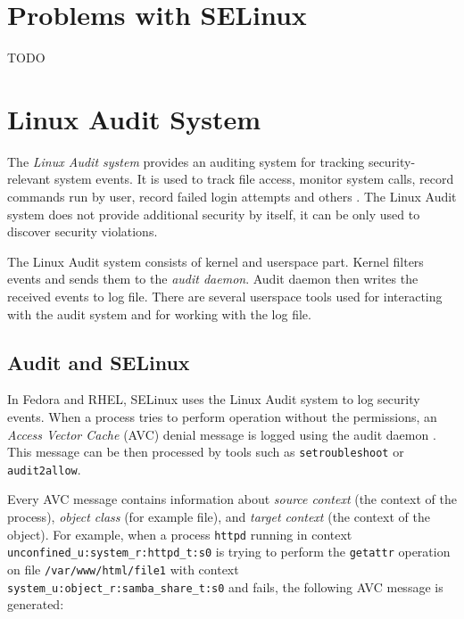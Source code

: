 \section{Problems with SELinux}
TODO

\section{Linux Audit System}
The \emph{Linux Audit system} provides an auditing system for tracking
security-relevant system events. It is used to track file access, monitor system
calls, record commands run by user, record failed login attempts and others
\cite{secguide}. The Linux Audit system does not provide additional security by
itself, it can be only used to discover security violations.

The Linux Audit system consists of kernel and userspace part. Kernel filters
events and sends them to the \emph{audit daemon}. Audit daemon then writes the
received events to log file. There are several userspace tools used for
interacting with the audit system and for working with the log file.

\subsection{Audit and SELinux}

In Fedora and RHEL, SELinux uses the Linux Audit system to log security events.
When a process tries to perform operation without the permissions, an
\emph{Access Vector Cache} (AVC) denial message is logged using the audit daemon
\cite{selinuxguide}. This message can be then processed by tools such as
\texttt{setroubleshoot} or \texttt{audit2allow}.

Every AVC message contains information about \emph{source context} (the context
of the process), \emph{object class} (for example file), and \emph{target
context} (the context of the object). For example, when a process \texttt{httpd}
running in context \texttt{unconfined\_u:system\_r:httpd\_t:s0} is trying to
perform the \texttt{getattr} operation on file \texttt{/var/www/html/file1} with
context \texttt{system\_u:object\_r:samba\_share\_t:s0} and fails, the following
AVC message is generated:

